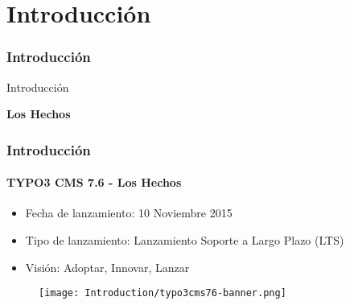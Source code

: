 %

\section{Introducción}
\begin{frame}[fragile]
	\frametitle{Introducción}

	\begin{center}\huge{Introducción}\end{center}
	\begin{center}\huge{\color{typo3darkgrey}\textbf{Los Hechos}}\end{center}

\end{frame}

\begin{frame}[fragile]
	\frametitle{Introducción}
	\framesubtitle{TYPO3 CMS 7.6 - Los Hechos}

	\begin{itemize}
		\item Fecha de lanzamiento: 10 Noviembre 2015
		\item Tipo de lanzamiento:
			\begingroup\color{red}Lanzamiento Soporte a Largo Plazo (LTS)\endgroup
		\item Visión: Adoptar, Innovar, Lanzar
	\end{itemize}

	\begin{figure}
		\texttt{[image: Introduction/typo3cms76-banner.png]}
	\end{figure}

\end{frame}

